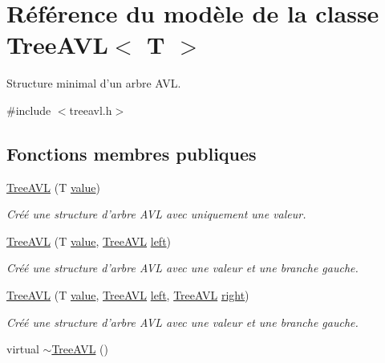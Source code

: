 \hypertarget{class_tree_a_v_l}{\section{Référence du modèle de la classe Tree\-A\-V\-L$<$ T $>$}
\label{class_tree_a_v_l}
}


Structure minimal d'un arbre A\-V\-L.  




{\ttfamily \#include $<$treeavl.\-h$>$}

\subsection*{Fonctions membres publiques}
\begin{DoxyCompactItemize}
\item 
\hyperlink{class_tree_a_v_l_a8fa918caad020a81710097d8d3d3f532}{Tree\-A\-V\-L} (T \hyperlink{class_tree_a_v_l_a334f2f454d7d64bdc3271fd55d0bda94}{value})
\begin{DoxyCompactList}\small\item\em Créé une structure d'arbre A\-V\-L avec uniquement une valeur. \end{DoxyCompactList}\item 
\hyperlink{class_tree_a_v_l_aec31261b721de9e7e7a9c35da17d348d}{Tree\-A\-V\-L} (T \hyperlink{class_tree_a_v_l_a334f2f454d7d64bdc3271fd55d0bda94}{value}, \hyperlink{class_tree_a_v_l}{Tree\-A\-V\-L} \hyperlink{class_tree_a_v_l_aeffecf910a25fcd4a2ec1f568db34935}{left})
\begin{DoxyCompactList}\small\item\em Créé une structure d'arbre A\-V\-L avec une valeur et une branche gauche. \end{DoxyCompactList}\item 
\hyperlink{class_tree_a_v_l_a05e73ba9c3ad1fb0da3834ba74ce51a1}{Tree\-A\-V\-L} (T \hyperlink{class_tree_a_v_l_a334f2f454d7d64bdc3271fd55d0bda94}{value}, \hyperlink{class_tree_a_v_l}{Tree\-A\-V\-L} \hyperlink{class_tree_a_v_l_aeffecf910a25fcd4a2ec1f568db34935}{left}, \hyperlink{class_tree_a_v_l}{Tree\-A\-V\-L} \hyperlink{class_tree_a_v_l_aa66f75a7f4a244d08beaaf100987ccc1}{right})
\begin{DoxyCompactList}\small\item\em Créé une structure d'arbre A\-V\-L avec une valeur et une branche gauche. \end{DoxyCompactList}\item 
virtual \hyperlink{class_tree_a_v_l_a2dc6a2719238fbbe39a5e62385aae57f}{$\sim$\-Tree\-A\-V\-L} ()

\end{DoxyCompactItemize}

